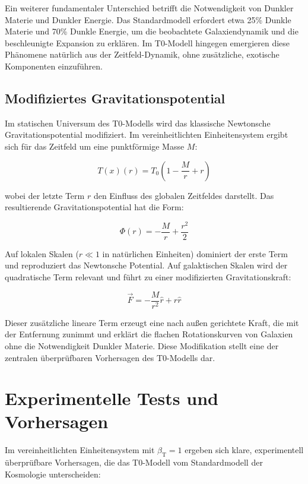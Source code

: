 \documentclass[12pt,a4paper]{article}
\newcommand{\Tfield}{T(x)}
\newcommand{\Tzero}{T_0}
\newcommand{\betaT}{\beta_{\text{T}}}
\begin{document}
	Ein weiterer fundamentaler Unterschied betrifft die Notwendigkeit von Dunkler Materie und Dunkler Energie. Das Standardmodell erfordert etwa 25\% Dunkle Materie und 70\% Dunkle Energie, um die beobachtete Galaxiendynamik und die beschleunigte Expansion zu erklären. Im T0-Modell hingegen emergieren diese Phänomene natürlich aus der Zeitfeld-Dynamik, ohne zusätzliche, exotische Komponenten einzuführen.
	
	\subsection{Modifiziertes Gravitationspotential}
	Im statischen Universum des T0-Modells wird das klassische Newtonsche Gravitationspotential modifiziert. Im vereinheitlichten Einheitensystem ergibt sich für das Zeitfeld um eine punktförmige Masse \(M\):
	
	\begin{equation}
		\Tfield(r) = \Tzero\left(1 - \frac{M}{r} + r\right)
	\end{equation}
	
	wobei der letzte Term \(r\) den Einfluss des globalen Zeitfeldes darstellt. Das resultierende Gravitationspotential hat die Form:
	
	\begin{equation}
		\Phi(r) = -\frac{M}{r} + \frac{r^2}{2}
	\end{equation}
	
	Auf lokalen Skalen (\(r \ll 1\) in natürlichen Einheiten) dominiert der erste Term und reproduziert das Newtonsche Potential. Auf galaktischen Skalen wird der quadratische Term relevant und führt zu einer modifizierten Gravitationskraft:
	
	\begin{equation}
		\vec{F} = -\frac{M}{r^2} \hat{r} + r \hat{r}
	\end{equation}
	
	Dieser zusätzliche lineare Term erzeugt eine nach außen gerichtete Kraft, die mit der Entfernung zunimmt und erklärt die flachen Rotationskurven von Galaxien ohne die Notwendigkeit Dunkler Materie. Diese Modifikation stellt eine der zentralen überprüfbaren Vorhersagen des T0-Modells dar.
	
	\section{Experimentelle Tests und Vorhersagen}
	Im vereinheitlichten Einheitensystem mit \(\betaT = 1\) ergeben sich klare, experimentell überprüfbare Vorhersagen, die das T0-Modell vom Standardmodell der Kosmologie unterscheiden:
	
\end{document}
